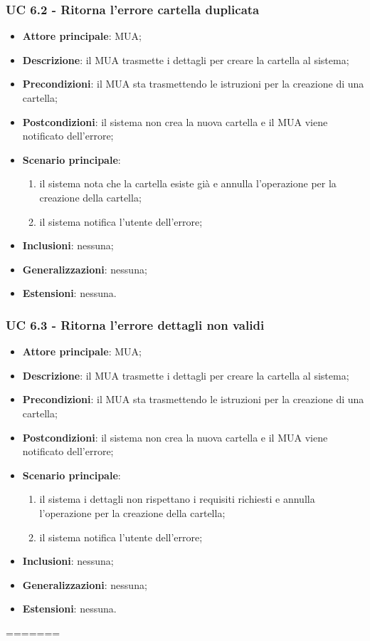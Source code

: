 \subsubsection{UC 6.2 - Ritorna l'errore cartella duplicata} \label{sec:UC6.2}
    \begin{itemize}
        \item \textbf{Attore principale}: MUA;
        \item \textbf{Descrizione}: il MUA trasmette i dettagli per creare la cartella al sistema;
        \item \textbf{Precondizioni}: il MUA sta trasmettendo le istruzioni per la creazione di una cartella;
        \item \textbf{Postcondizioni}: il sistema non crea la nuova cartella e il MUA viene notificato dell'errore;
        \item \textbf{Scenario principale}:
            \begin{enumerate}
                \item il sistema nota che la cartella esiste già e annulla l'operazione per la creazione della cartella;
                \item il sistema notifica l'utente dell'errore;
            \end{enumerate}
        \item \textbf{Inclusioni}: nessuna;
        \item \textbf{Generalizzazioni}: nessuna;
        \item \textbf{Estensioni}: nessuna.
    \end{itemize}

    \subsubsection{UC 6.3 - Ritorna l'errore dettagli non validi} \label{sec:UC6.3}
    \begin{itemize}
        \item \textbf{Attore principale}: MUA;
        \item \textbf{Descrizione}: il MUA trasmette i dettagli per creare la cartella al sistema;
        \item \textbf{Precondizioni}: il MUA sta trasmettendo le istruzioni per la creazione di una cartella;
        \item \textbf{Postcondizioni}: il sistema non crea la nuova cartella e il MUA viene notificato dell'errore;
        \item \textbf{Scenario principale}:
            \begin{enumerate}
                \item il sistema i dettagli non rispettano i requisiti richiesti e annulla l'operazione per la creazione della cartella;
                \item il sistema notifica l'utente dell'errore;
            \end{enumerate}
        \item \textbf{Inclusioni}: nessuna;
        \item \textbf{Generalizzazioni}: nessuna;
        \item \textbf{Estensioni}: nessuna.
    \end{itemize}
=======
